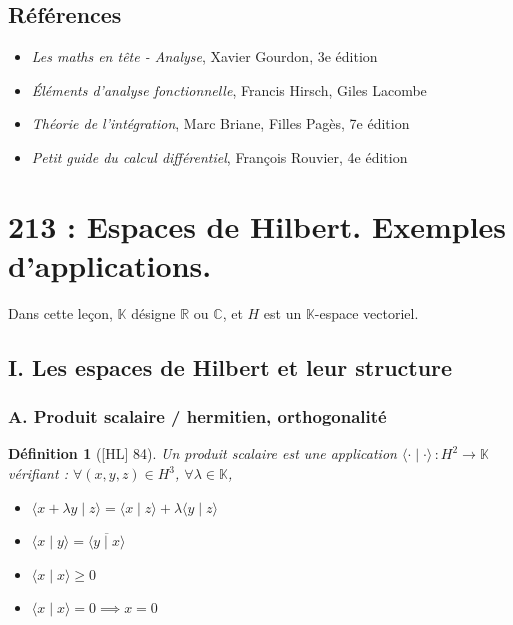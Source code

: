 \documentclass[10pt, a4paper, parskip=full, twoside, twocolumn]{report}
\newtheorem{definition}{Définition}
\newcommand{\IK}{\mathbb{K}}
\newcommand{\IC}{\mathbb{C}}
\newcommand{\IR}{\mathbb{R}}
\newcommand{\ps}[2]{\langle #1\mid #2\rangle}
\begin{document}
\section*{Références}
\begin{itemize}
	\item[G] \emph{Les maths en tête - Analyse}, Xavier Gourdon, 3e édition 
	\item[HL] \emph{Éléments d'analyse fonctionnelle}, Francis Hirsch, Giles Lacombe
	\item[BP] \emph{Théorie de l'intégration}, Marc Briane, Filles Pagès, 7e édition
	\item[Rv] \emph{Petit guide du calcul différentiel}, François Rouvier, 4e édition
\end{itemize}

\chapter*{213 : Espaces de Hilbert. Exemples d’applications.}
\setcounter{definition}{0}

\textcolor{paragraphtext}{Dans cette leçon, $\IK$ désigne $\IR$ ou $\IC$, et $H$ est un $\IK$-espace vectoriel.}

\section*{I. Les espaces de Hilbert et leur structure}
\subsection*{A. Produit scalaire / hermitien, orthogonalité}

\begin{definition}[\textnormal{[HL] 84}]
	Un \emph{produit scalaire} est une application $\ps{\cdot}{\cdot}\,\colon H^2\to\IK$ vérifiant :
	$\forall (x,y,z)\in H^3$, $\forall\lambda\in\IK$,
	\begin{itemize}
		\item $\ps{x+\lambda y}{z} = \ps{x}{z}+\lambda\ps{y}{z}$
		\item $\ps{x}{y} = \overline{\ps{y}{x}}$
		\item $\ps{x}{x} \geq 0$
		\item $\ps{x}{x} = 0 \implies x=0$
	\end{itemize}
\end{definition}
\end{document}
